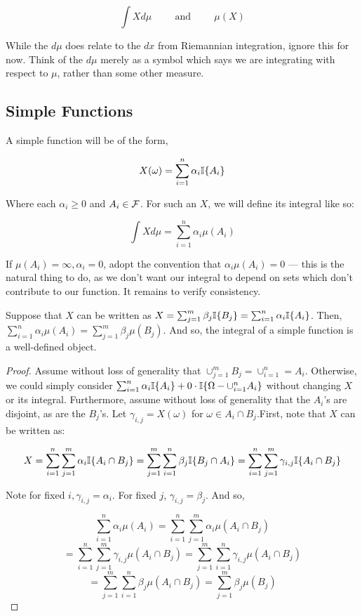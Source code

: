 \[ \int X d\mu \hspace{1cm} \text{and} \hspace{1cm} \mu(X) \]

While the $d\mu$ does relate to the $dx$ from Riemannian integration, ignore this for now. 
Think of the $d\mu$ merely as a symbol which says we are integrating with respect to 
$\mu$, rather than some other measure. 

\subsection{Simple Functions}

A simple function will be of the form, 

\[ X(\omega) = \sum_{i=1}^n \alpha_i \mathbb I\{A_i\} \]

Where each $\alpha_i \geq 0$ and $A_i \in \mathcal F$. For such an $X$, we will 
define its integral like so:

\[ \int X d\mu = \sum_{i=1}^n \alpha_i \mu(A_i) \]

If $\mu(A_i) = \infty, \alpha_i = 0$, adopt the convention that 
$\alpha_i \mu(A_i) = 0$ — this is the natural thing to do, as we don't want 
our integral to depend on sets which don't contribute to our function. It remains to verify consistency.

\begin{Proposition} 
    Suppose that $X$ can be written as $X = \sum_{j=1}^m \beta_j \mathbb I\{B_j\} =  \sum_{i=1}^n \alpha_i \mathbb I\{A_i\}$. 
Then, $\sum_{i=1}^n \alpha_i \mu(A_i) = \sum_{j=1}^m \beta_j \mu(B_j)$.
And so, the integral of a simple function is a well-defined object.
\end{Proposition}

\begin{proof}

Assume without loss of generality that $\cup_{j=1}^m B_j = \cup_{i=1}^n = A_i$. 
Otherwise, we could simply consider $\sum_{i=1}^n \alpha_i \mathbb I\{A_i\} + 0 \cdot \mathbb I\{\Omega - \cup_{i=1}^n A_i \}$ 
without changing $X$ or its integral. Furthermore, assume without loss of generality that the 
$A_i$'s are disjoint, as are the $B_j$'s. Let $\gamma_{i,j} = X(\omega)$ for $\omega \in A_i \cap B_j$.First, note that $X$ can be written as: 

\[ X = \sum_{i=1}^n \sum_{j=1}^m \alpha_i \mathbb I\{A_i \cap B_j\} =  \sum_{j=1}^m  \sum_{i=1}^n \beta_j \mathbb I\{B_j \cap A_i \} = \sum_{i=1}^n \sum_{j=1}^m \gamma_{i,j} \mathbb I\{A_i \cap B_j\}\]

Note for fixed $i, \gamma_{i,j} = \alpha_i$. For fixed $j$, $\gamma_{i,j} = \beta_j$. And so,

\[ \sum_{i=1}^n \alpha_i \mu(A_i) = \sum_{i=1}^n \sum_{j=1}^m \alpha_i \mu(A_i \cap B_j) \]
\[ = \sum_{i=1}^n \sum_{j=1}^m \gamma_{i,j} \mu(A_i \cap B_j) =  \sum_{j=1}^m \sum_{i=1}^n\gamma_{i,j} \mu(A_i \cap B_j) \]
\[ = \sum_{j=1}^m \sum_{i=1}^n\beta_j \mu(A_i \cap B_j) = \sum_{j=1}^m \beta_j \mu(B_j) \]

\end{proof}

